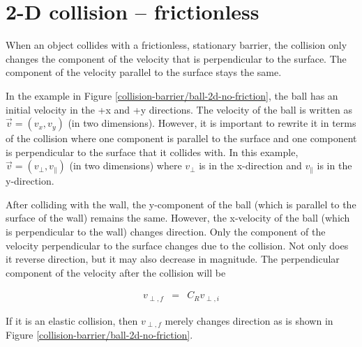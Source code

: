
\section*{2-D collision -- frictionless}

When an object collides with a frictionless, stationary barrier, the collision only changes the component of the velocity that is perpendicular to the surface. The component of the velocity parallel to the surface stays the same. 

In the example in Figure \ref{collision-barrier/ball-2d-no-friction}, the ball has an initial velocity in the +x and +y directions. The velocity of the ball is written as $\vec{v}=(v_x,v_y)$ (in two dimensions). However, it is important to rewrite it in terms of the collision where one component is parallel to the surface and one component is perpendicular to the surface that it collides with. In this example, $\vec{v}=(v_\perp,v_\parallel)$ (in two dimensions) where $v_\perp$ is in the x-direction and $v_\parallel$ is in the y-direction.


After colliding with the wall, the y-component of the ball (which is parallel to the surface of the wall) remains the same. However, the x-velocity of the ball (which is perpendicular to the wall) changes direction.  Only the component of the velocity perpendicular to the surface changes due to the collision. Not only does it reverse direction, but it may also decrease in magnitude. The perpendicular component of the velocity after the collision will be

\begin{eqnarray*}
	v_{\perp,f} & = & C_R v_{\perp,i}
\end{eqnarray*}

If it is an elastic collision, then $v_{\perp,f}$ merely changes direction as is shown in Figure \ref{collision-barrier/ball-2d-no-friction}.


